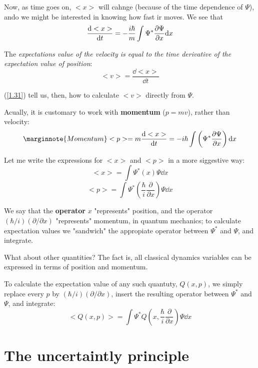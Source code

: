 Now, as time goes on, $<x>$ will cahnge (because of the time dependence of $\Psi$), ando we might be interested in knowing how fast ir moves. We see that
\begin{equation}\label{1.31}
	\frac{\dd <x>}{\dd t}=-\frac{i\hbar}{m}\int\Psi^ *\pdv{\Psi}{x}\dd x
\end{equation}

The \textit{expectations value of the velocity is equal to the time derivative of the expectation value of position}:
\begin{equation}\label{1.32}
	<v>=\frac{\dd <x>}{\dd t}
\end{equation}

(\ref{1.31}) tell us, then, how to calculate $<v>$ directly from $\Psi$.

Acually, it is customary to work with \textbf{momentum} ($p=mv$), rather than velocity:
\begin{equation}\label{1.33}\marginnote{Momentum}
	<p>=m\frac{\dd <x>}{\dd t}=-i\hbar\int\left(\Psi^*\pdv{\Psi}{x}\right)\dd x
\end{equation}

Let me write the expressions for $<x>$ and $<p>$ in a more siggestive way:
\begin{equation}\label{1.34}
	<x>=\int\Psi^*(x)\Psi \dd x
\end{equation}
\begin{equation}\label{1.35}
	<p>=\int\Psi^*\left(\frac{\hbar}{i}\frac{\partial}{\partial x}\right)\Psi \dd x
\end{equation}

We say that the \textbf{operator} $x$ "represents" position, and the operator $(\hbar/i)(\partial/\partial x)$ "represents" momentum, in quantum mechanics; to calculate expectation values we "sandwich" the appropiate operator between $\Psi^*$ and $\Psi$, and integrate.

What about other quantities? The fact is, all classical dynamics variables can be expressed in terms of position and momentum.

To calculate the expectation value of any such quantuty, $Q(x,p)$, we simply replace every $p$ by $(\hbar/i)(\partial/\partial x)$, insert the resulting operator between $\Psi^*$ and $\Psi$, and integrate:
\begin{equation}\label{1.36}
	\boxed{<Q(x,p)>=\int\Psi^*Q\left(x,\frac{\hbar}{i}\frac{\partial}{\partial x}\right)\Psi\dd x}
\end{equation}

\section{The uncertaintly principle}
